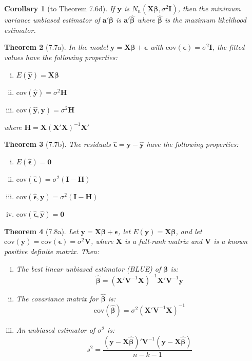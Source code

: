 \documentclass{article}
\newtheorem{theorem}{Theorem}[section]
\newtheorem{corollary}[theorem]{Corollary}
\begin{document}
\begin{corollary}[to Theorem 7.6d]
If $\mathbf{y}$ is $N_n(\mathbf{X}\boldsymbol{\beta}, \sigma^2\mathbf{I})$, then the minimum variance unbiased estimator of $\mathbf{a}'\boldsymbol{\beta}$ is $\mathbf{a}'\hat{\boldsymbol{\beta}}$ where $\hat{\boldsymbol{\beta}}$ is the maximum likelihood estimator.
\end{corollary}

\begin{theorem}[7.7a]
In the model $\mathbf{y} = \mathbf{X}\boldsymbol{\beta} + \boldsymbol{\epsilon}$ with $\text{cov}(\boldsymbol{\epsilon}) = \sigma^2\mathbf{I}$, the fitted values have the following properties:
\begin{enumerate}[(i)]
\item $E(\hat{\mathbf{y}}) = \mathbf{X}\boldsymbol{\beta}$
\item $\text{cov}(\hat{\mathbf{y}}) = \sigma^2\mathbf{H}$
\item $\text{cov}(\hat{\mathbf{y}}, \mathbf{y}) = \sigma^2\mathbf{H}$
\end{enumerate}
where $\mathbf{H} = \mathbf{X}(\mathbf{X}'\mathbf{X})^{-1}\mathbf{X}'$
\end{theorem}

\begin{theorem}[7.7b]
The residuals $\hat{\boldsymbol{\epsilon}} = \mathbf{y} - \hat{\mathbf{y}}$ have the following properties:
\begin{enumerate}[(i)]
\item $E(\hat{\boldsymbol{\epsilon}}) = \mathbf{0}$
\item $\text{cov}(\hat{\boldsymbol{\epsilon}}) = \sigma^2(\mathbf{I} - \mathbf{H})$
\item $\text{cov}(\hat{\boldsymbol{\epsilon}}, \mathbf{y}) = \sigma^2(\mathbf{I} - \mathbf{H})$
\item $\text{cov}(\hat{\boldsymbol{\epsilon}}, \hat{\mathbf{y}}) = \mathbf{0}$
\end{enumerate}
\end{theorem}

\begin{theorem}[7.8a]
Let $\mathbf{y} = \mathbf{X}\boldsymbol{\beta} + \boldsymbol{\epsilon}$, let $E(\mathbf{y}) = \mathbf{X}\boldsymbol{\beta}$, and let $\text{cov}(\mathbf{y}) = \text{cov}(\boldsymbol{\epsilon}) = \sigma^2\mathbf{V}$, where $\mathbf{X}$ is a full-rank matrix and $\mathbf{V}$ is a known positive definite matrix. Then:
\begin{enumerate}[(i)]
\item The best linear unbiased estimator (BLUE) of $\boldsymbol{\beta}$ is:
\[\hat{\boldsymbol{\beta}} = (\mathbf{X}'\mathbf{V}^{-1}\mathbf{X})^{-1}\mathbf{X}'\mathbf{V}^{-1}\mathbf{y}\]
\item The covariance matrix for $\hat{\boldsymbol{\beta}}$ is:
\[\text{cov}(\hat{\boldsymbol{\beta}}) = \sigma^2(\mathbf{X}'\mathbf{V}^{-1}\mathbf{X})^{-1}\]
\item An unbiased estimator of $\sigma^2$ is:
\[s^2 = \frac{(\mathbf{y} - \mathbf{X}\hat{\boldsymbol{\beta}})'\mathbf{V}^{-1}(\mathbf{y} - \mathbf{X}\hat{\boldsymbol{\beta}})}{n-k-1}\]
\end{enumerate}
\end{theorem}
\end{document}
